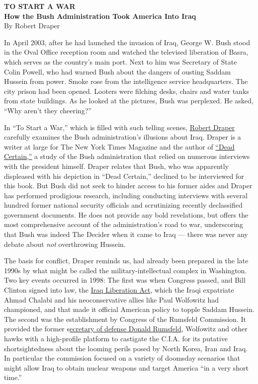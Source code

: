 \textbf{TO START A WAR}\\
\textbf{How the Bush Administration Took America Into Iraq}\\
By Robert Draper

In April 2003, after he had launched the invasion of Iraq, George W.
Bush stood in the Oval Office reception room and watched the televised
liberation of Basra, which serves as the country's main port. Next to
him was Secretary of State Colin Powell, who had warned Bush about the
dangers of ousting Saddam Hussein from power. Smoke rose from the
intelligence service headquarters. The city prison had been opened.
Looters were filching desks, chairs and water tanks from state
buildings. As he looked at the pictures, Bush was perplexed. He asked,
``Why aren't they cheering?''

In ``To Start a War,'' which is filled with such telling scenes,
\href{https://www.nytimes.com/by/robert-draper}{Robert Draper} carefully
examines the Bush administration's illusions about Iraq. Draper is a
writer at large for The New York Times Magazine and the author of
\href{https://www.nytimes.com/2007/11/04/books/review/Lewis3-t.html}{``Dead
Certain,''} a study of the Bush administration that relied on numerous
interviews with the president himself. Draper relates that Bush, who was
apparently displeased with his depiction in ``Dead Certain,'' declined
to be interviewed for this book. But Bush did not seek to hinder access
to his former aides and Draper has performed prodigious research,
including conducting interviews with several hundred former national
security officials and scrutinizing recently declassified government
documents. He does not provide any bold revelations, but offers the most
comprehensive account of the administration's road to war, underscoring
that Bush was indeed The Decider when it came to Iraq --- there was
never any debate about \emph{not} overthrowing Hussein.

The basis for conflict, Draper reminds us, had already been prepared in
the late 1990s by what might be called the military-intellectual complex
in Washington. Two key events occurred in 1998: The first was when
Congress passed, and Bill Clinton signed into law, the
\href{https://www.congress.gov/bill/105th-congress/house-bill/4655}{Iraq
Liberation Act}, which the Iraqi expatriate Ahmad Chalabi and his
neoconservative allies like Paul Wolfowitz had championed, and that made
it official American policy to topple Saddam Hussein. The second was the
establishment by Congress of the Rumsfeld Commission. It provided the
former
s\href{https://history.defense.gov/Multimedia/Biographies/Article-View/Article/571280/donald-h-rumsfeld/}{ecretary
of defense Donald Rumsfeld}, Wolfowitz and other hawks with a
high-profile platform to castigate the C.I.A. for its putative
shortsightedness about the looming perils posed by North Korea, Iran and
Iraq. In particular the commission focused on a variety of doomsday
scenarios that might allow Iraq to obtain nuclear weapons and target
America ``in a very short time.''

